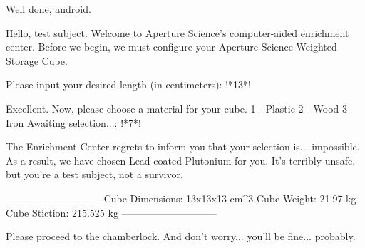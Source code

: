 \begin{frame}[fragile]{Well done, android.}\onslide<+->%
    \begin{solve}
        \tiny%
        \begin{plaintext}
Hello, test subject. Welcome to Aperture Science's computer-aided enrichment center.
Before we begin, we must configure your Aperture Science Weighted Storage Cube.

Please input your desired length (in centimeters): !*\textcolor{sol@colors@lst@numbers}{13}*!

Excellent. Now, please choose a material for your cube.
  1 - Plastic
  2 - Wood
  3 - Iron
Awaiting selection...: !*\textcolor{sol@colors@lst@numbers}{7}*!

The Enrichment Center regrets to inform you that your selection is... impossible.
As a result, we have chosen Lead-coated Plutonium for you. It's terribly unsafe, but you're a test subject, not a survivor.

-----------------------------
Cube Dimensions: 13x13x13 cm^3
Cube Weight:     21.97 kg
Cube Stiction:   215.525 kg
-----------------------------

Please proceed to the chamberlock. And don't worry... you'll be fine... probably.
        \end{plaintext}
    \end{solve}
\end{frame}
